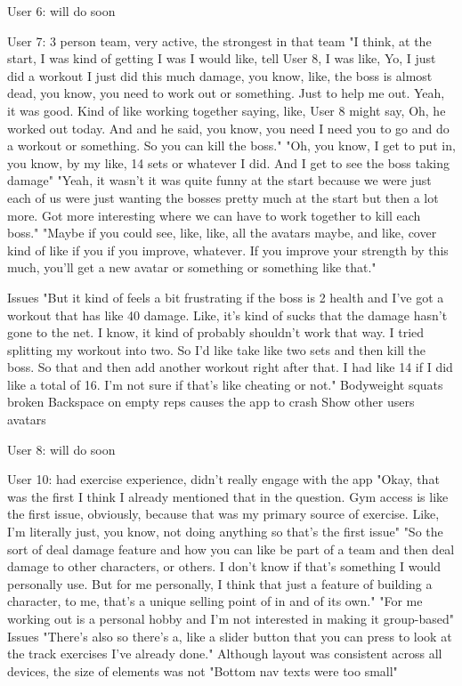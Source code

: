\documentclass{l4proj}
\begin{document}
User 6: will do soon

User 7: 3 person team, very active, the strongest in that team
  "I think, at the start, I was kind of getting I was I would like, tell User 8, I was like, Yo, I just did a workout I just did this much damage, you know, like, the boss is almost dead, you know, you need to work out or something. Just to help me out. Yeah, it was good. Kind of like working together saying, like, User 8 might say, Oh, he worked out today. And and he said, you know, you need I need you to go and do a workout or something. So you can kill the boss."
  "Oh, you know, I get to put in, you know, by my like, 14 sets or whatever I did. And I get to see the boss taking damage"
  "Yeah, it wasn't it was quite funny at the start because we were just each of us were just wanting the bosses pretty much at the start but then a lot more. Got more interesting where we can have to work together to kill each boss."
  "Maybe if you could see, like, like, all the avatars maybe, and like, cover kind of like if you if you improve, whatever. If you improve your strength by this much, you'll get a new avatar or something or something like that."

  Issues
    "But it kind of feels a bit frustrating if the boss is 2 health and I've got a workout that has like 40 damage. Like, it's kind of sucks that the damage hasn't gone to the net. I know, it kind of probably shouldn't work that way. I tried splitting my workout into two. So I'd like take like two sets and then kill the boss. So that and then add another workout right after that. I had like 14 if I did like a total of 16. I'm not sure if that's like cheating or not."
    Bodyweight squats broken
    Backspace on empty reps causes the app to crash
    Show other users avatars

User 8: will do soon

User 10: had exercise experience, didn't really engage with the app
  "Okay, that was the first I think I already mentioned that in the question. Gym access is like the first issue, obviously, because that was my primary source of exercise. Like, I'm literally just, you know, not doing anything so that's the first issue"
  "So the sort of deal damage feature and how you can like be part of a team and then deal damage to other characters, or others. I don't know if that's something I would personally use. But for me personally, I think that just a feature of building a character, to me, that's a unique selling point of in and of its own." 
  "For me working out is a personal hobby and I'm not interested in making it group-based"
  Issues  
    "There's also so there's a, like a slider button that you can press to look at the track exercises I've already done."
    Although layout was consistent across all devices, the size of elements was not
    "Bottom nav texts were too small"
\end{document}
